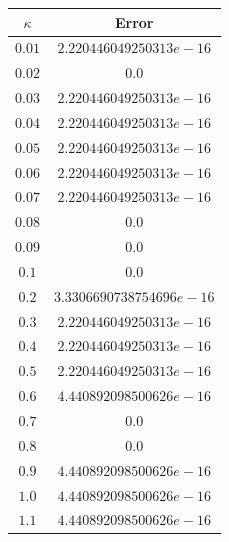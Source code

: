 \begin{center}
\begin{tabular}{|c|c|}
		\hline
		$\kappa$&  Error  \\
		\hline
		$0.01$ &  $2.220446049250313e-16$\\
		\hline
		$0.02$& $0.0$ \\
		\hline
		$0.03$	& $2.220446049250313e-16$  \\
		\hline
		$0.04$&  $2.220446049250313e-16$\\
		\hline
		$0.05$&  $2.220446049250313e-16$\\
		\hline
		$0.06$&  $2.220446049250313e-16$\\
		\hline
		$0.07$&  $2.220446049250313e-16$\\
		\hline
		$0.08$& $0.0$  \\
		\hline
		$0.09$& $0.0$  \\
		\hline
		$0.1$& $0.0$  \\
		\hline
		$0.2$&$3.3306690738754696e-16$  \\
		\hline
		$0.3$& $2.220446049250313e-16$ \\
		\hline
		$0.4$&$2.220446049250313e-16$  \\
		\hline
		$0.5$&$2.220446049250313e-16$  \\
		\hline
		$0.6$& $4.440892098500626e-16$ \\
		\hline
		$0.7$& $0.0$  \\
		\hline
		$0.8$& $0.0$ \\
		\hline
		$0.9$& $4.440892098500626e-16$   \\
		\hline
		$1.0$& $4.440892098500626e-16$  \\
		\hline
		$1.1$& $4.440892098500626e-16$  \\
		\hline
\end{tabular}
\end{center}
